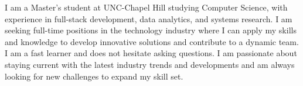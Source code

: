 

\begin{cvparagraph}

I am a Master's student at UNC-Chapel Hill studying Computer Science, with experience in full-stack development, data analytics, and systems research. I am seeking full-time positions in the technology industry where I can apply my skills and knowledge to develop innovative solutions and contribute to a dynamic team. I am a fast learner and does not hesitate asking questions. I am passionate about staying current with the latest industry trends and developments and am always looking for new challenges to expand my skill set.
\end{cvparagraph}